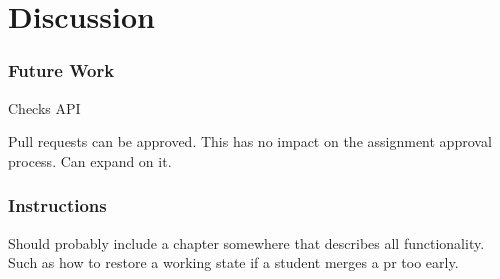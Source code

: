 
\chapter{Discussion}
\label{ch:discussion}

\subsection{Future Work}

Checks API

Pull requests can be approved. This has no impact on the assignment approval process. Can expand on it.

\subsection{Instructions}

Should probably include a chapter somewhere that describes all functionality.
Such as how to restore a working state if a student merges a pr too early.
